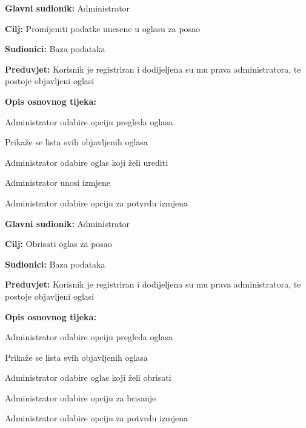 \noindent {}
\begin{packed_item}
	
	\item \textbf{Glavni sudionik: } Administrator
	\item  \textbf{Cilj:} Promijeniti podatke unesene u oglasu za posao
	\item  \textbf{Sudionici:} Baza podataka
	\item  \textbf{Preduvjet:} Korisnik je registriran i dodijeljena su mu prava administratora, te postoje objavljeni oglasi
	\item  \textbf{Opis osnovnog tijeka:}
	
	\item[] \begin{packed_enum}
		
		\item Administrator odabire opciju pregleda oglasa
		\item Prikaže se lista svih objavljenih oglasa
		\item Administrator odabire oglas koji želi urediti
		\item Administrator unosi izmjene
		\item Administrator odabire opciju za potvrdu izmjena
	\end{packed_enum}
\end{packed_item}

\noindent {}
\begin{packed_item}
	
	\item \textbf{Glavni sudionik: } Administrator
	\item  \textbf{Cilj:} Obrisati oglas za posao
	\item  \textbf{Sudionici:} Baza podataka
	\item  \textbf{Preduvjet:} Korisnik je registriran i dodijeljena su mu prava administratora, te postoje objavljeni oglasi
	\item  \textbf{Opis osnovnog tijeka:}
	
	\item[] \begin{packed_enum}
		
		\item Administrator odabire opciju pregleda oglasa
		\item Prikaže se lista svih objavljenih oglasa
		\item Administrator odabire oglas koji želi obrisati
		\item Administrator odabire opciju za brisanje
		\item Administrator odabire opciju za potvrdu izmjena
	\end{packed_enum}
\end{packed_item}

